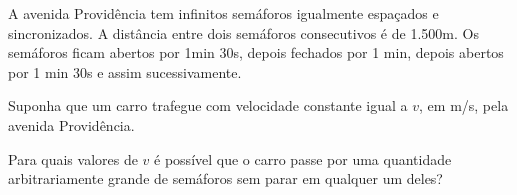 A avenida Providência tem infinitos semáforos igualmente espaçados e sincronizados. A distância entre dois semáforos consecutivos é de 1.500m. Os semáforos ficam abertos por 1min 30s, depois fechados por 1 min, depois abertos por 1 min 30s e assim sucessivamente.

Suponha que um carro trafegue com velocidade constante igual a $v$, em m/s, pela avenida Providência.

Para quais valores de $v$ é possível que o carro passe por uma quantidade arbitrariamente grande de semáforos sem parar em qualquer um deles?